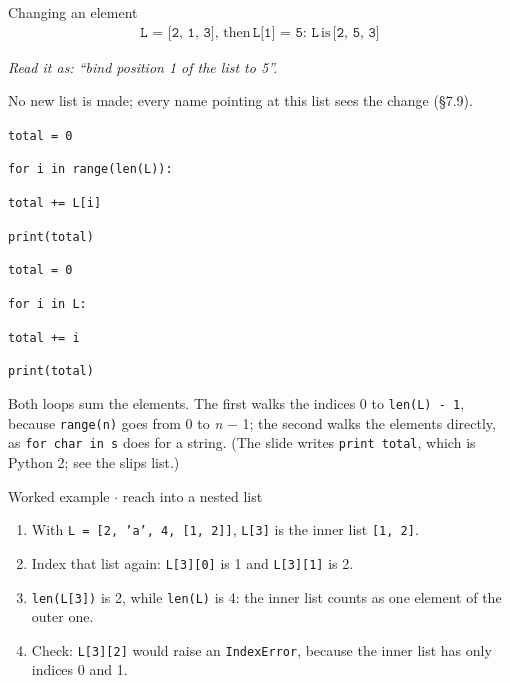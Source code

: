 \documentclass[11pt]{article}
\begin{document}
\begin{keepsection}
\begin{equationcard}{Changing an element}
\[ \begin{gathered} \texttt{L = [2, 1, 3]},\, \text{then}\, \texttt{L[1] = 5}:\, \texttt{L}\, \text{is}\, \texttt{[2, 5, 3]} \end{gathered} \]
{\small \emph{Read it as: “bind position 1 of the list to 5”.}\par  No new list is made; every name pointing at this list sees the change (§7.9).}
\end{equationcard}
\begin{tcolorbox}[colback=Paperblue,colframe=Paperblue,boxrule=0pt,arc=0pt,left=7pt,right=7pt,top=5pt,bottom=5pt]\small\sloppy
\noindent\hspace*{0em}\texttt{total = 0}\par
\noindent\hspace*{0em}\texttt{for i in range(len(L)):}\par
\noindent\hspace*{1em}\texttt{total += L[i]}\par
\noindent\hspace*{0em}\texttt{print(total)}\par
\noindent\hspace*{0em}\texttt{}\par
\noindent\hspace*{0em}\texttt{total = 0}\par
\noindent\hspace*{0em}\texttt{for i in L:}\par
\noindent\hspace*{1em}\texttt{total += i}\par
\noindent\hspace*{0em}\texttt{print(total)}\par
\end{tcolorbox}

Both loops sum the elements. The first walks the indices 0 to \texttt{len(L) - 1}, because \texttt{range(n)} goes from 0 to \textit{n} \ensuremath{-} 1; the second walks the elements directly, as \texttt{for char in s} does for a string. (The slide writes \texttt{print total}, which is Python 2; see the slips list.)

\begin{workedbox}{Worked example \ensuremath{\cdot} reach into a nested list}
\begin{enumerate}
\item With \texttt{L = [2, 'a', 4, [1, 2]]}, \texttt{L[3]} is the inner list \texttt{[1, 2]}.
\item Index that list again: \texttt{L[3][0]} is 1 and \texttt{L[3][1]} is 2.
\item \texttt{len(L[3])} is 2, while \texttt{len(L)} is 4: the inner list counts as one element of the outer one.
\item Check: \texttt{L[3][2]} would raise an \texttt{IndexError}, because the inner list has only indices 0 and 1.
\end{enumerate}
\end{workedbox}


\end{keepsection}
\end{document}
